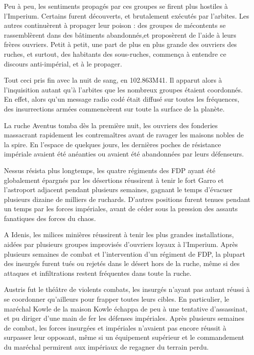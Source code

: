 \documentclass[10pt,a4paper]{book}
\begin{document}
Peu à peu, les sentiments propagés par ces groupes se firent plus hostiles à l'Imperium. Certains furent découverts, et brutalement exécutés par l'arbites. Les autres continuèrent à propager leur poison : des groupes de mécontents se rassemblèrent dans des bâtiments abandonnés,et proposèrent de l'aide à leurs frères ouvriers. Petit à petit, une part de plus en plus grande des ouvriers des ruches, et surtout, des habitants des sous-ruches, commença à entendre ce discours anti-impérial, et à le propager.

Tout ceci pris fin avec la nuit de sang, en 102.863M41. Il apparut alors à l'inquisition autant qu'à l'arbites que les nombreux groupes étaient coordonnés. En effet, alors qu'un message radio codé était diffusé sur toutes les fréquences, des insurrections armées commencèrent sur toute la surface de la planète.

La ruche Aventus tomba dès la première nuit, les ouvriers des fonderies massacrant rapidement les contremaîtres avant de ravager les maisons nobles de la spire. En l'espace de quelques jours, les dernières poches de résistance impériale avaient été anéanties ou avaient été abandonnées par leurs défenseurs.

Nessus résista plus longtemps, les quatre régiments des FDP ayant été globalement épargnés par les désertions réussirent à tenir le fort Garro et l'astroport adjacent pendant plusieurs semaines, gagnant le temps d'évacuer plusieurs dizaine de milliers de ruchards. D'autres positions furent tenues pendant un temps par les forces impériales, avant de céder sous la pression des assauts fanatiques des forces du chaos.

A Idenis, les milices minières réussirent à tenir les plus grandes installations, aidées par plusieurs groupes improvisés d'ouvriers loyaux à l'Imperium. Après plusieurs semaines de combat et l'intervention d'un régiment de FDP, la plupart des insurgés furent tués ou rejetés dans le désert hors de la ruche, même si des attaques et infiltrations restent fréquentes dans toute la ruche.

Austris fut le théâtre de violents combats, les insurgés n'ayant pas autant réussi à se coordonner qu'ailleurs pour frapper toutes leurs cibles. En particulier, le maréchal Kowle de la maison Kowle échappa de peu à une tentative d'assassinat, et pu diriger d'une main de fer les défenses impériales. Après plusieurs semaines de combat, les forces insurgées et impériales n'avaient pas encore réussit à surpasser leur opposant, même si un équipement supérieur et le commandement du maréchal permirent aux impériaux de regagner du terrain perdu.
\end{document}
